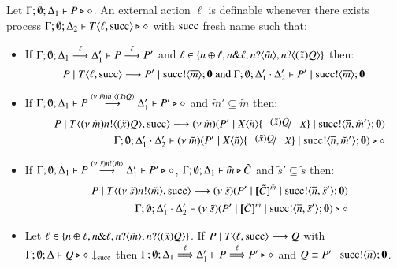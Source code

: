\begin{definition}[Definibility]\rm
	Let $\Gamma; \emptyset; \Delta_1 \vdash P \triangleright \diamond$.
	An external action $\ell$ is definable whenever
	there exists process
	$\Gamma; \emptyset; \Delta_2 \vdash T\langle \ell, \textrm{succ} \rangle \triangleright \diamond$
	with $\textrm{succ}$ fresh name %
	such that:
%
	\begin{itemize}
		\item	If $\Gamma; \emptyset; \Delta_1 \stackrel{\ell}{\longrightarrow} \Delta_1' \vdash P \stackrel{\ell}{\longrightarrow} P'$ and
			$\ell \in \{n \oplus \ell, n \& \ell, n ? \langle \tilde{m} \rangle, n ? \langle (\tilde{x}) Q \rangle\}$
			then:
%
\[
			P \;|\; T\langle \ell, \textrm{succ} \rangle \longrightarrow P' \;|\; \textrm{succ} ! \langle \overline{m} \rangle ; \mathbf{0} \textrm{ and }
			\Gamma; \emptyset; \Delta_1' \cdot \Delta_2' \vdash P' \;|\; \textrm{succ} ! \langle \overline{m} \rangle ; \mathbf{0}
\]
%
		\item	If $\Gamma; \emptyset; \Delta_1 \vdash P \stackrel{(\nu\ \tilde{m})n ! \langle (\tilde{x})Q \rangle}{\longrightarrow} \Delta_1' \vdash P' \triangleright \diamond$
			and $\tilde{m}' \subseteq \tilde{m}$
			then:
%
			\begin{eqnarray*}
				& & P \Par T\lrangle{\news{\tilde{m}}\bactout{n}{\abs{\tilde{x}}{Q}}, \suc} \red \newsp{\tilde{m}}{P' \Par \appl{X}{\tilde{n}} \subst{(\tilde{x}) Q}{X} \Par \bout{\suc}{\dual{n}, \tilde{m}'} \inact}\\
				& & \Gamma; \emptyset; \Delta_1' \cat \Delta_2' \proves \newsp{\tilde{m}}{P' \Par \appl{X}{\tilde{n}} \subst{(\tilde{x}) Q}{X} \Par \bout{\suc}{\dual{n}, \tilde{m}'} \inact} \hastype \Proc
			\end{eqnarray*}
%
		\item	If $\Gamma; \emptyset; \Delta_1 \vdash P \stackrel{(\nu\ \tilde{s})n ! \langle \tilde{m} \rangle}{\longrightarrow} \Delta_1' \vdash P' \triangleright \diamond$,
			$\Gamma; \emptyset; \Delta_1 \vdash \tilde{m} \triangleright \tilde{C}$
			and $\tilde{s}' \subseteq \tilde{s}$
			then:
%
			\begin{eqnarray*}
				& & P \Par T\lrangle{\news{\tilde{s}}\bactout{n}{\tilde{m}}, \suc} \red \newsp{\tilde{s}}{P' \Par \map{\tilde{C}}^{\tilde{m}} \Par \bout{\suc}{\dual{n}, \tilde{s}'} \inact}\\
				& & \Gamma; \emptyset; \Delta_1' \cat \Delta_2' \proves \newsp{\tilde{s}}{P' \Par \map{\tilde{C}}^{\tilde{m}} \Par \bout{\suc}{\dual{n}, \tilde{s}'} \inact} \hastype \Proc
			\end{eqnarray*}
%
		\item	Let $\ell \in \{n \oplus \ell, n \& \ell, n ? \langle \tilde{m} \rangle, n ? \langle (\tilde{x}) Q \rangle\}$.
			If $P \;|\; T\langle \ell, \textrm{succ} \rangle \longrightarrow Q$ with			
			$\Gamma; \emptyset; \Delta \vdash Q \triangleright \diamond \downarrow_{\textrm{succ}}$ then 
			$\Gamma; \emptyset; \Delta_1 \stackrel{\ell}{\Longrightarrow} \Delta_1' \vdash P \stackrel{\ell}{\Longrightarrow} P' \triangleright \diamond$
			and $Q \equiv P' \;|\; \textrm{succ} ! \langle \overline{n} \rangle ; \mathbf{0}$.


\end{itemize}
\end{definition}
